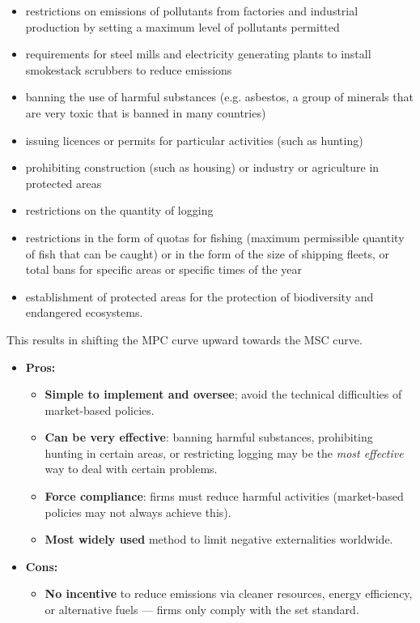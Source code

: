 \begin{itemize}
  \begin{itemize}
    \item restrictions on emissions of pollutants from
factories and industrial production by setting a maximum level of pollutants permitted
\item requirements for steel mills and electricity
generating plants to install smokestack scrubbers to reduce emissions
\item banning the use of harmful substances (e.g.
asbestos, a group of minerals that are very toxic that is banned in many countries)
\item issuing licences or permits for particular activities (such as hunting)
\item prohibiting construction (such as housing) or industry or agriculture in protected areas
\item restrictions on the quantity of logging
\item restrictions in the form of quotas for fishing (maximum permissible quantity of fish that can be caught) or in the form of the size of shipping fleets, or total bans for specific areas or specific times of the year
\item establishment of protected areas for the protection of biodiversity and endangered ecosystems.
  \end{itemize}
  This results in shifting the MPC curve upward towards the MSC curve.
  \begin{itemize}
    \item \textbf{Pros:}
    \begin{itemize}
      \item \textbf{Simple to implement and oversee}; avoid the technical difficulties of market-based policies.
      \item \textbf{Can be very effective}: banning harmful substances, prohibiting hunting in certain areas, or restricting logging may be the \textit{most effective} way to deal with certain problems.
      \item \textbf{Force compliance}: firms must reduce harmful activities (market-based policies may not always achieve this).
      \item \textbf{Most widely used} method to limit negative externalities worldwide.
    \end{itemize}
    \item \textbf{Cons:}
    \begin{itemize}
      \item \textbf{No incentive} to reduce emissions via cleaner resources, energy efficiency, or alternative fuels --- firms only comply with the set standard.

\end{itemize}
\end{itemize}
\end{itemize}
